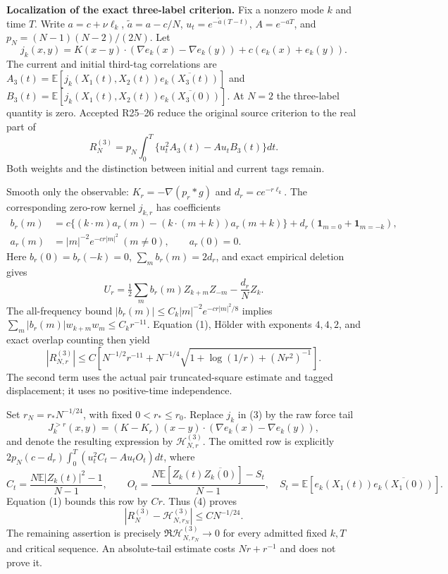 \documentclass[11pt]{article}
\newcommand{\E}{\mathbb E}
\begin{document}
\newpage
\noindent\textbf{Localization of the exact three-label criterion.}
Fix a nonzero mode $k$ and time $T$. Write $a=c+\nu\ell_k$,
$\widetilde a=a-c/N$, $u_t=e^{-\widetilde a(T-t)}$, $A=e^{-aT}$, and
$p_N=(N-1)(N-2)/(2N)$. Let
\[
 j_k(x,y)=K(x-y)\cdot(\nabla e_k(x)-\nabla e_k(y))+c(e_k(x)+e_k(y)).
\]
The current and initial third-tag correlations are $A_3(t)=\E[j_k(X_1(t),X_2(t))\overline{e_k(X_3(t))}]$ and
$B_3(t)=\E[j_k(X_1(t),X_2(t))\overline{e_k(X_3(0))}]$.
At $N=2$ the three-label quantity is zero. Accepted R25--26 reduce the original source criterion to the real part of
\[
 R_N^{(3)}=p_N\int_0^T\{u_t^2 A_3(t)-Au_tB_3(t)\}dt.\tag{3}
\]
Both weights and the distinction between initial and current tags remain.

Smooth only the observable: $K_r=-\nabla(p_r*g)$ and $d_r=ce^{-r\ell_k}$.
The corresponding zero-row kernel $j_{k,r}$ has coefficients
\[
\begin{split}
 b_r(m)&=c\{(k\cdot m)a_r(m)-(k\cdot(m+k))a_r(m+k)\}
            +d_r(\mathbf1_{m=0}+\mathbf1_{m=-k}),\\
 a_r(m)&=|m|^{-2}e^{-cr|m|^2}\ (m\ne0),\qquad a_r(0)=0.
\end{split}
\]
Here $b_r(0)=b_r(-k)=0$, $\sum_m b_r(m)=2d_r$, and exact empirical deletion gives
\[
 U_r=\tfrac12\sum_m b_r(m)Z_{k+m}Z_{-m}-\frac{d_r}{N}Z_k.
\]
The all-frequency bound $|b_r(m)|\le C_k|m|^{-2}e^{-cr|m|^2/8}$ implies
$\sum_m|b_r(m)|w_{k+m}w_m\le C_kr^{-11}$.
Equation (1), H\"older with exponents $4,4,2$, and exact overlap counting then yield
\[
 |R_{N,r}^{(3)}|\le C\left[N^{-1/2}r^{-11}
       +N^{-1/4}\sqrt{1+\log(1/r)+(Nr^2)^{-1}}\right].\tag{4}
\]
The second term uses the actual pair truncated-square estimate and tagged displacement; it uses no positive-time independence.

Set $r_N=r_*N^{-1/24}$, with fixed $0<r_*\le r_0$. Replace $j_k$ in (3) by the raw force tail
\[
 J_k^{>r}(x,y)=(K-K_r)(x-y)\cdot(\nabla e_k(x)-\nabla e_k(y)),
\]
and denote the resulting expression by $\mathcal H_{N,r}^{(3)}$.
The omitted row is explicitly $2p_N(c-d_r)\int_0^T(u_t^2C_t-Au_tO_t)dt$, where
\[
 C_t=\frac{N\E|Z_k(t)|^2-1}{N-1},\qquad
 O_t=\frac{N\E[Z_k(t)\overline{Z_k(0)}]-S_t}{N-1},
 \quad S_t=\E[e_k(X_1(t))\overline{e_k(X_1(0))}].
\]
Equation (1) bounds this row by $Cr$. Thus (4) proves
\[
 |R_N^{(3)}-\mathcal H_{N,r_N}^{(3)}|\le CN^{-1/24}.\tag{5}
\]
The remaining assertion is precisely $\Re\mathcal H_{N,r_N}^{(3)}\to0$ for every admitted fixed $k,T$ and critical sequence. An absolute-tail estimate costs $Nr+r^{-1}$ and does not prove it.
\end{document}
